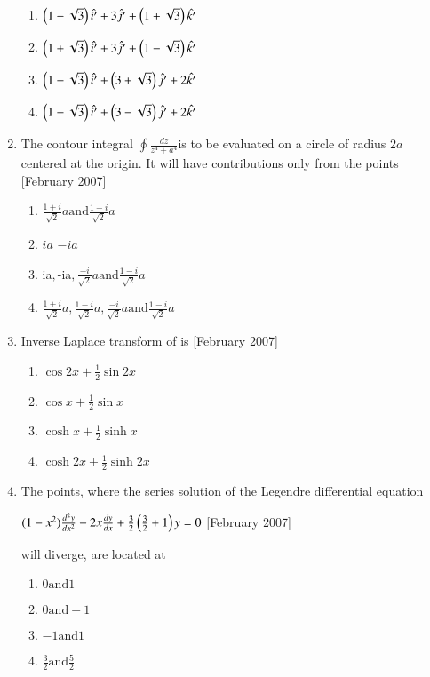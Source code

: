 \documentclass[journal]{IEEEtran}
\begin{document}
\begin{enumerate}
\begin{enumerate}
\item $\left(1-\sqrt{3}\right)\hat{i'} + 3\hat{j'} + \left(1+\sqrt{3}\right)\hat{k'}$
\item $\left(1+\sqrt{3}\right)\hat{i'} + 3\hat{j'} + \left(1-\sqrt{3}\right)\hat{k'}$
\item $\left(1-\sqrt{3}\right)\hat{i'} + \left(3+\sqrt{3}\right)\hat{j'} + 2\hat{k'}$
\item $\left(1-\sqrt{3}\right)\hat{i'} + \left(3-\sqrt{3}\right)\hat{j'} + 2\hat{k'}$
\end{enumerate}
\item The contour integral  $\oint \frac{dz}{z^4 + a^4}$is to be evaluated on a circle of radius $2a$ centered at the origin. It will have contributions only from the points \hfill[February 2007]
\begin{enumerate}
\item $ \frac{1+i}{\sqrt{2}}a  \text{and}  \frac{1-i}{\sqrt{2}}a$

\item   $ia$    $-ia$
\item $  $ia$,  $-ia$,  \frac{-i}{\sqrt{2}}a \text{and}  \frac{1-i}{\sqrt{2}}a$
\item $  \frac{1+i}{\sqrt{2}}a,  \frac{1-i}{\sqrt{2}}a,  \frac{-i}{\sqrt{2}}a  \text{and}  \frac{1-i}{\sqrt{2}}a$
\end{enumerate}
\item Inverse Laplace transform of  is \hfill[February 2007]
\begin{enumerate}
\item $ \cos {2x} + \frac{1}{2}\sin {2x}$
\item $ \cos {x} + \frac{1}{2}\sin {x}$

\item $\cosh {x} + \frac{1}{2}\sinh {x}$
\item $ \cosh {2x} + \frac{1}{2}\sinh {2x}$
\end{enumerate}
\item The points, where the series solution of the Legendre differential equation

$(1 - x^2)\frac{d^2 y}{dx^2} - 2x\frac{dy}{dx} + \frac{3}{2}\left(\frac{3}{2}+1\right)y = 0 $ \hfill[February 2007]

will diverge, are located at
\begin{enumerate}
\item $  0 \text{and}  1$
\item $  0 \text{and} -1$
\item $ -1 \text{and}  1$
\item $ \frac{3}{2}  \text{and} \frac{5}{2} $
\end{enumerate}


\end{enumerate}
\end{document}
